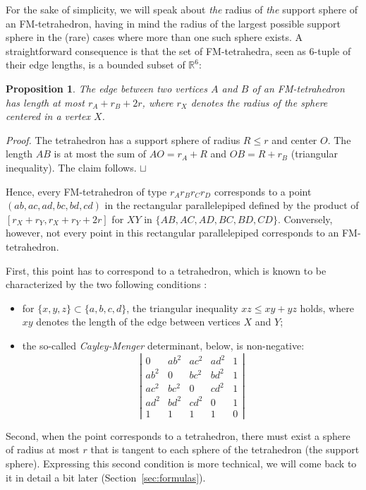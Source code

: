 \documentclass[11pt]{article}
\newtheorem{proposition}{Proposition}
\newenvironment{proof}{\noindent \emph{Proof. }}{\hfill \hbox{\rlap{$\sqcap$}$\sqcup$}\\}
\begin{document}
For the sake of simplicity, we will speak about {\em the} radius of {\em the} support sphere of an FM-tetrahedron, having in mind the radius of the largest possible support sphere in the (rare) cases where more than one such sphere exists.
A straightforward consequence is that the set of FM-tetrahedra, seen as $6$-tuple of their edge lengths, is a bounded subset of $\mathbb{R}^6$:

\begin{proposition}
\label{prop:bounded_edge}
The edge between two vertices $A$ and $B$ of an FM-tetrahedron has length at most $r_A+r_B+2r$, where $r_X$ denotes the radius of the sphere centered in a vertex $X$.
\end{proposition}

\begin{proof}
The tetrahedron has a support sphere of radius $R\leq r$ and center $O$.
The length $AB$ is at most the sum of $AO=r_A+R$ and $OB=R+r_B$ (triangular inequality).
The claim follows.
\end{proof}

Hence, every FM-tetrahedron of type $r_Ar_Br_Cr_D$ corresponds to a point $(ab,ac,ad,bc,bd,cd)$ in the rectangular parallelepiped defined by the product of $[r_X+r_Y,r_X+r_Y+2r]$ for $XY$ in $\{AB,AC,AD,BC,BD,CD\}$.
Conversely, however, not every point in this rectangular parallelepiped corresponds to an FM-tetrahedron.

First, this point has to correspond to a tetrahedron, which is known to be characterized by the two following conditions \cite{DW09}:
\begin{itemize}
\item for $\{x,y,z\}\subset\{a,b,c,d\}$, the triangular inequality $xz\leq xy+yz$ holds, where $xy$ denotes the length of the edge between vertices $X$ and $Y$;
\item the so-called {\em Cayley-Menger} determinant, below, is non-negative:
\[
\left|\begin{array}{cccccc}
0 & ab^2 & ac^2 & ad^2 & 1 \\
ab^2 & 0 & bc^2 & bd^2 & 1 \\
ac^2 & bc^2 & 0 & cd^2 & 1 \\
ad^2 & bd^2 & cd^2 & 0 & 1 \\
1 & 1 & 1 & 1 & 0
\end{array}\right|
\]
\end{itemize}

Second, when the point corresponds to a tetrahedron, there must exist a sphere of radius at most $r$ that is tangent to each sphere of the tetrahedron (the support sphere).
Expressing this second condition is more technical, we will come back to it in detail a bit later (Section~\ref{sec:formulas}).
\end{document}
